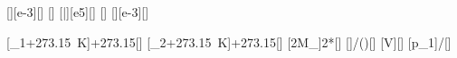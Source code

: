 [\liter][e-3][\meter\cubed]
[\degreeCelsius]
[\bar][e5][\pascal]
[\degreeCelsius]
[\gram\per\mole][e-3][\kilogram\per\mole]

[\vartheta_1+\SI{273.15}{\kelvin}]{\thEiX+273.15}[\kelvin]
[\vartheta_2+\SI{273.15}{\kelvin}]{\thZwX+273.15}[\kelvin]
[2M_]{2*\MOX}[\kilogram\per\mole]
[]{\pEiX*\MOzX/(\ncRX*\TEiX)}[\kilogram\per\meter\cubed]
[\rho V]{\rOX*\VOX}[\kilogram]
[p_1\cdot{}]{\pEiX*\TZwX/\TEiX}[\pascal]
